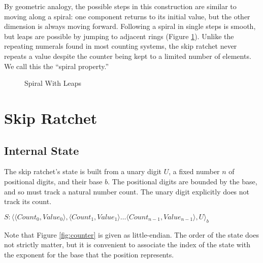 \documentclass[twocolumn]{article}
\begin{document}
	By geometric analogy, the possible steps in this construction are similar to moving along a spiral: one component returns to its initial value, but the other dimension is always moving forward. Following a spiral in single steps is smooth, but leaps are possible by jumping to adjacent rings (Figure \ref{fig:spiral-metaphor}). Unlike the repeating numerals found in most counting systems, the skip ratchet never repeats a value despite the counter being kept to a limited number of elements. We call this the ``spiral property.''
	
	\begin{figure}[h]
		\centering
		
		
		\caption{Spiral With Leaps}
		\label{fig:spiral-metaphor}
	\end{figure}
	
	\section{Skip Ratchet}
	
	\subsection{Internal State}
	
	The skip ratchet's state is built from a unary digit $U$, a fixed number $n$ of positional digits, and their base $b$. The positional digits are bounded by the base, and so must track a natural number count. The unary digit explicitly does not track its count.
	
	\begin{figure*}[h]
		\centering
		
		$S : \langle \langle Count_{0}, Value_{0} \rangle, \langle Count_{1}, Value_{1} \rangle \ldots \langle Count_{n-1}, Value_{n-1} \rangle, U\rangle_{b}$
		
		\caption{Skip Ratchet Counter}
		\label{fig:counter}
	\end{figure*}

	Note that Figure \ref{fig:counter} is given as little-endian. The order of the state does not strictly matter, but it is convenient to associate the index of the state with the exponent for the base that the position represents.
	
\end{document}
